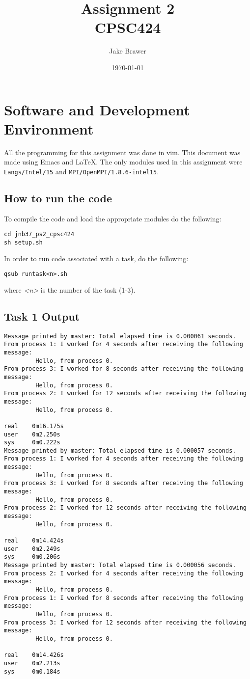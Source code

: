 \documentclass[11pt]{article}
\author{Jake Brawer}
\date{\today}
\title{Assignment 2\\\medskip
\large CPSC424}
\begin{document}
\maketitle

\section{Software and Development Environment}
\label{sec:org283e359}
All the programming for this assignment was done in vim. This document was made using Emacs and \LaTeX. The only modules used in this assignment were \texttt{Langs/Intel/15} and \texttt{MPI/OpenMPI/1.8.6-intel15}.

\subsection{How to run the code}
\label{sec:orgb5f6f4d}

To compile the code and load the appropriate modules do the following:
\begin{verbatim}
cd jnb37_ps2_cpsc424
sh setup.sh
\end{verbatim}

In order to run code associated with a task, do the following:
\begin{verbatim}
qsub runtask<n>.sh
\end{verbatim}
where \emph{<n>} is the number of the task (1-3).

\subsection{Task 1 Output}
\label{sec:orgd36ff09}
\begin{verbatim}
Message printed by master: Total elapsed time is 0.000061 seconds.
From process 1: I worked for 4 seconds after receiving the following message:
         Hello, from process 0.
From process 3: I worked for 8 seconds after receiving the following message:
         Hello, from process 0.
From process 2: I worked for 12 seconds after receiving the following message:
         Hello, from process 0.

real    0m16.175s
user    0m2.250s
sys     0m0.222s
Message printed by master: Total elapsed time is 0.000057 seconds.
From process 1: I worked for 4 seconds after receiving the following message:
         Hello, from process 0.
From process 3: I worked for 8 seconds after receiving the following message:
         Hello, from process 0.
From process 2: I worked for 12 seconds after receiving the following message:
         Hello, from process 0.

real    0m14.424s
user    0m2.249s
sys     0m0.206s
Message printed by master: Total elapsed time is 0.000056 seconds.
From process 2: I worked for 4 seconds after receiving the following message:
         Hello, from process 0.
From process 1: I worked for 8 seconds after receiving the following message:
         Hello, from process 0.
From process 3: I worked for 12 seconds after receiving the following message:
         Hello, from process 0.

real    0m14.426s
user    0m2.213s
sys     0m0.184s
\end{verbatim}
\end{document}
